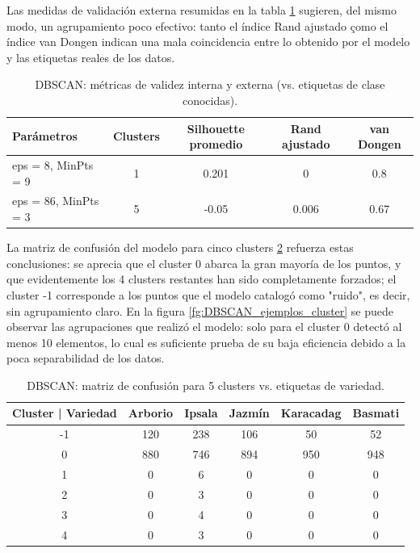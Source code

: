 \documentclass{article}
\begin{document}
Las medidas de validación externa resumidas en la tabla \ref{tab:dbscan} sugieren, del mismo modo, un agrupamiento poco efectivo: tanto el índice Rand ajustado çomo el índice van Dongen indican una mala coincidencia entre lo obtenido por el modelo y las etiquetas reales de los datos.

\begin{table}[!htb]
  \centering
  \begin{tabular}{lcccc}
    \toprule
    Parámetros & Clusters & Silhouette promedio & Rand ajustado & van Dongen\\
    \midrule
    eps = 8, MinPts = 9 & 1 &  0.201 &  0 & 0.8\\ 
    eps = 86, MinPts = 3 & 5 &  -0.05 &  0.006 & 0.67 \\
    \bottomrule
    \end{tabular}
    \caption{DBSCAN: métricas de validez interna y externa (vs. etiquetas de clase conocidas).}
    \label{tab:dbscan}
\end{table}

La matriz de confusión del modelo para cinco clusters \ref{tab:mc_dbscan} refuerza estas conclusiones: se aprecia que el cluster 0 abarca la gran mayoría de los puntos, y que evidentemente los 4 clusters restantes han sido completamente forzados; el cluster -1 corresponde a los puntos que el modelo catalogó como "ruido", es decir, sin agrupamiento claro. En la figura \ref{fg:DBSCAN_ejemplos_cluster} se puede observar las agrupaciones que realizó el modelo: solo para el cluster 0 detectó al menos 10 elementos, lo cual es suficiente prueba de su baja eficiencia debido a la poca separabilidad de los datos.

\begin{table}
    \centering
    \begin{tabular}{cccccc}
    \toprule
    Cluster | Variedad &  Arborio &  Ipsala &  Jazmín &  Karacadag & Basmati \\
    \midrule
    -1 & 120 & 238 & 106 & 50 & 52 \\
    0 & 880 & 746 & 894 & 950 & 948 \\
    1 & 0 & 6 & 0 & 0 & 0 \\
    2 & 0 & 3 & 0 & 0 & 0 \\
    3 & 0 & 4 & 0 & 0 & 0 \\
    4 & 0 & 3 & 0 & 0 &0 \\
    \bottomrule
    \end{tabular}
    \caption{DBSCAN: matriz de confusión para 5 clusters vs. etiquetas de variedad.}
    \label{tab:mc_dbscan}
\end{table}
\end{document}
